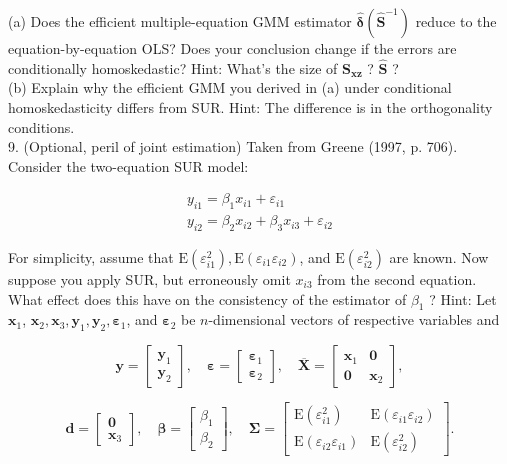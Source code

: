 \documentclass[10pt]{article}
\begin{document}
(a) Does the efficient multiple-equation GMM estimator $\hat{\boldsymbol{\delta}}\left(\widehat{\mathbf{S}}^{-1}\right)$ reduce to the equation-by-equation OLS? Does your conclusion change if the errors are conditionally homoskedastic? Hint: What's the size of $\mathbf{S}_{\mathbf{x z}}$ ? $\widehat{\mathbf{S}}$ ?\\
(b) Explain why the efficient GMM you derived in (a) under conditional homoskedasticity differs from SUR. Hint: The difference is in the orthogonality conditions.\\
9. (Optional, peril of joint estimation) Taken from Greene (1997, p. 706). Consider the two-equation SUR model:

$$
\begin{gathered}
y_{i 1}=\beta_{1} x_{i 1}+\varepsilon_{i 1} \\
y_{i 2}=\beta_{2} x_{i 2}+\beta_{3} x_{i 3}+\varepsilon_{i 2}
\end{gathered}
$$

For simplicity, assume that $\mathrm{E}\left(\varepsilon_{i 1}^{2}\right), \mathrm{E}\left(\varepsilon_{i 1} \varepsilon_{i 2}\right)$, and $\mathrm{E}\left(\varepsilon_{i 2}^{2}\right)$ are known. Now suppose you apply SUR, but erroneously omit $x_{i 3}$ from the second equation. What effect does this have on the consistency of the estimator of $\beta_{1}$ ? Hint: Let $\mathbf{x}_{1}$, $\mathbf{x}_{2}, \mathbf{x}_{3}, \mathbf{y}_{1}, \mathbf{y}_{2}, \boldsymbol{\varepsilon}_{1}$, and $\boldsymbol{\varepsilon}_{2}$ be $n$-dimensional vectors of respective variables and

$$
\mathbf{y}=\left[\begin{array}{l}
\mathbf{y}_{1} \\
\mathbf{y}_{2}
\end{array}\right], \quad \boldsymbol{\varepsilon}=\left[\begin{array}{l}
\boldsymbol{\varepsilon}_{1} \\
\boldsymbol{\varepsilon}_{2}
\end{array}\right], \quad \overline{\mathbf{X}}=\left[\begin{array}{cc}
\mathbf{x}_{1} & \mathbf{0} \\
\mathbf{0} & \mathbf{x}_{2}
\end{array}\right],
$$

$$
\mathbf{d}=\left[\begin{array}{c}
\mathbf{0} \\
\mathbf{x}_{3}
\end{array}\right], \quad \boldsymbol{\beta}=\left[\begin{array}{c}
\beta_{1} \\
\beta_{2}
\end{array}\right], \quad \boldsymbol{\Sigma}=\left[\begin{array}{cc}
\mathrm{E}\left(\varepsilon_{i 1}^{2}\right) & \mathrm{E}\left(\varepsilon_{i 1} \varepsilon_{i 2}\right) \\
\mathrm{E}\left(\varepsilon_{i 2} \varepsilon_{i 1}\right) & \mathrm{E}\left(\varepsilon_{i 2}^{2}\right)
\end{array}\right] .
$$
\end{document}
